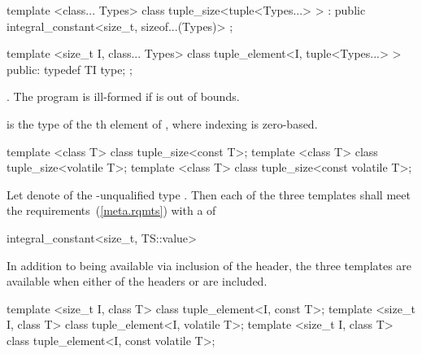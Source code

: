 %
\begin{itemdecl}
template <class... Types>
class tuple_size<tuple<Types...> >
  : public integral_constant<size_t, sizeof...(Types)> { };
\end{itemdecl}

%
\begin{itemdecl}
template <size_t I, class... Types>
class tuple_element<I, tuple<Types...> > {
public:
  typedef TI type;
};
\end{itemdecl}

\begin{itemdescr}
\pnum
\requires {}.
The program is ill-formed if  is out of bounds.

\pnum
\ctype {} is the
type of the th element of ,
where indexing is zero-based.
\end{itemdescr}

\begin{itemdecl}
template <class T> class tuple_size<const T>;
template <class T> class tuple_size<volatile T>;
template <class T> class tuple_size<const volatile T>;
\end{itemdecl}

\begin{itemdescr}
\pnum
Let  denote  of the \cv-unqualified type . Then each
of the three templates shall meet the  requirements~(\ref{meta.rqmts})
with a  of
\begin{codeblock}
integral_constant<size_t, TS::value>
\end{codeblock}

\pnum
In addition to being available via inclusion of the  header,
the three templates are available when either of the headers  or
 are included.
\end{itemdescr}

\begin{itemdecl}
template <size_t I, class T> class tuple_element<I, const T>;
template <size_t I, class T> class tuple_element<I, volatile T>;
template <size_t I, class T> class tuple_element<I, const volatile T>;
\end{itemdecl}

